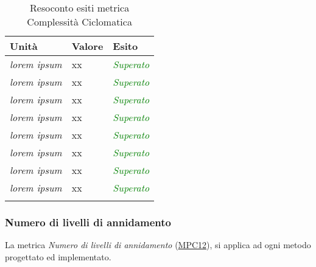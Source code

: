 \begin{longtable}{|>{\centering\arraybackslash}p{5cm}|>{\centering\arraybackslash}p{3cm}|>{\centering\arraybackslash}p{3cm}|}
	\hline
	\rowcolor{Gray}
	\textbf{Unità} & \textbf{Valore} & \textbf{Esito} \\
	\hline
	
	\textit{lorem ipsum} & xx & \textcolor{Green}{\textit{Superato}}\\
	\hline
	\textit{lorem ipsum} & xx & \textcolor{Green}{\textit{Superato}}\\
	\hline
	\textit{lorem ipsum} & xx & \textcolor{Green}{\textit{Superato}}\\
	\hline
	\textit{lorem ipsum} & xx & \textcolor{Green}{\textit{Superato}}\\
	\hline
	\textit{lorem ipsum} & xx & \textcolor{Green}{\textit{Superato}}\\
	\hline
	\textit{lorem ipsum} & xx & \textcolor{Green}{\textit{Superato}}\\
	\hline
	\textit{lorem ipsum} & xx & \textcolor{Green}{\textit{Superato}}\\
	\hline
	\textit{lorem ipsum} & xx & \textcolor{Green}{\textit{Superato}}\\
	\hline
	
	\caption{Resoconto esiti metrica Complessità Ciclomatica}
\end{longtable}

\subsubsection{Numero di livelli di annidamento}
La metrica \textit{Numero di livelli di annidamento} (\hyperlink{MPC12}{MPC12}), si applica ad ogni metodo progettato ed implementato.

